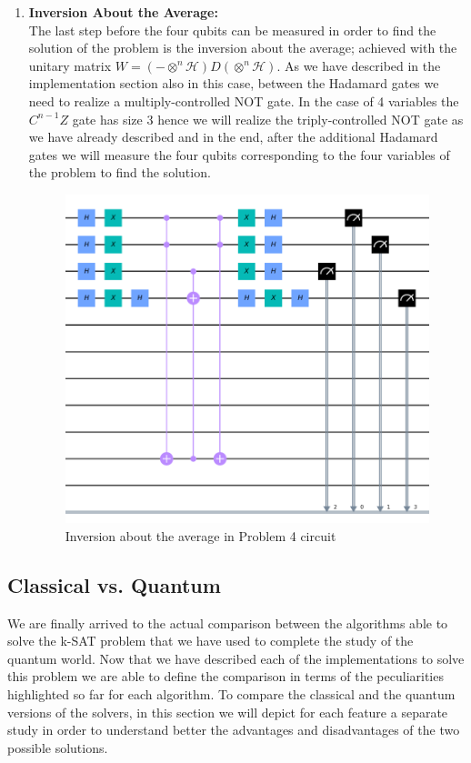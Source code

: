 \documentclass[english]{article}
\begin{document}
\begin{enumerate}
					\item \textbf{Inversion About the Average:}\\
						The last step before the four qubits can be measured in order to find the solution of the problem is the inversion about the average; achieved with the unitary matrix $W = (-\otimes^n\mathcal{H})D(\otimes^n\mathcal{H})$. As we have described in the implementation section also in this case, between the Hadamard gates we need to realize a multiply-controlled NOT gate. In the case of 4 variables the $C^{n-1}Z$ gate has size 3 hence we will realize the triply-controlled NOT gate as we have already described and in the end, after the additional Hadamard gates we will measure the four qubits corresponding to the four variables of the problem to find the solution.
						\begin{figure}[h]
							\centering
							\includegraphics[scale=0.67]{Average_Inversion_Circuit.png}
							\caption{
								\label{fig:averageInversionCircuit}
								Inversion about the average in Problem 4 circuit
							}
						\end{figure}
				\end{enumerate}
			
		\subsection{Classical vs. Quantum}
		\label{sec:satCsatQ}
			We are finally arrived to the actual comparison between the algorithms able to solve the k-SAT problem that we have used to complete the study of the quantum world. Now that we have described each of the implementations to solve this problem we are able to define the comparison in terms of the peculiarities highlighted so far for each algorithm. To compare the classical and the quantum versions of the solvers, in this section we will depict for each feature a separate study in order to understand better the advantages and disadvantages of the two possible solutions.
			
\end{document}
